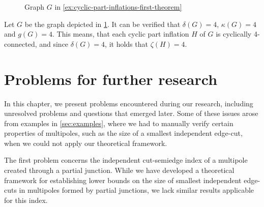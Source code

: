 \documentclass[12pt, twoside]{book}
\begin{document}
\begin{example}\label{ex:cyclic-part-inflations-first-theorem}
	\begin{figure}
		\centering
		\caption{Graph $G$ in \cref{ex:cyclic-part-inflations-first-theorem}}
		\label{fig:cyclic-part-inflations-ex-2-before}
	\end{figure}

	Let $G$ be the graph depicted in \cref{fig:cyclic-part-inflations-ex-2-before}. It can be verified that $\delta(G)=4$, $\kappa(G)=4$ and $g(G)=4$. This means, that each cyclic part inflation $H$ of $G$ is cyclically 4-connected, and since $\delta(G)=4$, it holds that $\zeta(H)=4$.
\end{example}


\chapter{Problems for further research}\label{ch:problems-for-research}

In this chapter, we present problems encountered during our research, including unresolved problems and questions that emerged later. Some of these issues arose from examples in \cref{sec:examples}, where we had to manually verify certain properties of multipoles, such as the size of a smallest independent edge-cut, when we could not apply our theoretical framework.

The first problem concerns the independent cut-semiedge index of a multipole created through a partial junction. While we have developed a theoretical framework for establishing lower bounds on the size of smallest independent edge-cuts in multipoles formed by partial junctions, we lack similar results applicable for this index.
\end{document}
